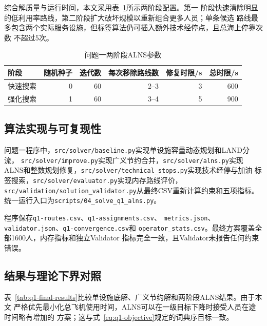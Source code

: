 综合解质量与运行时间，本文采用表~\ref{tab:q1-alns-parameters}所示两阶段配置。第一
阶段快速清除明显的低利用率路线，第二阶段扩大破坏规模以重新组合更多人员；单条候选
路线最多包含两个实际服务设施，但标签算法仍可插入额外技术经停点，且总海上停靠次数
不超过5次。

\begin{table}[htbp]
  \centering
  \caption{问题一两阶段ALNS参数}
  \label{tab:q1-alns-parameters}
  \begin{tabular}{lrrrrr}
    \toprule
    阶段 & 随机种子 & 迭代数 & 每次移除路线数 & 修复时限/s & 总时限/s\\
    \midrule
    快速搜索 & 0 & 60 & 2--3 & 3 & 600\\
    强化搜索 & 1 & 60 & 3--4 & 5 & 900\\
    \bottomrule
  \end{tabular}
\end{table}

\subsection{算法实现与可复现性}

问题一程序中，\texttt{src/solver/baseline.py}实现单设施容量动态规划和LAND分流，
\texttt{src/solver/improve.py}实现广义节约合并，\texttt{src/solver/alns.py}实现
ALNS和整数规划修复，\texttt{src/solver/technical\_stops.py}实现技术经停与加油
标签搜索，\texttt{src/solver/evaluator.py}实现内存路线评价，
\texttt{src/validation/solution\_validator.py}从最终CSV重新计算约束和五项指标。
统一运行入口为\texttt{scripts/04\_solve\_q1\_alns.py}。

程序保存\texttt{q1-routes.csv}、\texttt{q1-assignments.csv}、
\texttt{metrics.json}、\texttt{validator.json}、\texttt{q1-convergence.csv}和
\texttt{operator\_stats.csv}。最终方案覆盖全部1600人，内存指标和独立Validator
指标完全一致，且Validator未报告任何约束错误。

\subsection{结果与理论下界对照}

表~\ref{tab:q1-final-results}比较单设施底解、广义节约解和两阶段ALNS结果。由于本文
严格优先最小化总飞机使用时间，ALNS可以在一级目标下降时接受人员在途时间略有增加的
方案；这与式~\eqref{eq:q1-objective}规定的词典序目标一致。

